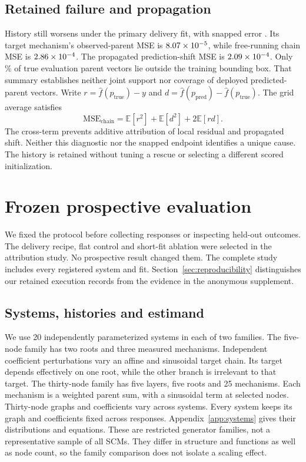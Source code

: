 \subsection{Retained failure and propagation}
History \WorseSeed{} still worsens under the primary delivery fit, with snapped
error \AWorseSnapped{}. Its target mechanism's observed-parent MSE is
$8.07\times10^{-5}{}$, while free-running chain MSE is $2.86\times10^{-4}{}$.
The propagated prediction-shift MSE is $2.09\times10^{-4}{}$. Only
\AWorseOutsidePercent{}\% of true evaluation parent vectors lie outside the
training bounding box. That summary establishes neither joint support nor
coverage of deployed predicted-parent vectors. Write
$r=\hat f(p_{\mathrm{true}})-y$ and
$d=\hat f(p_{\mathrm{pred}})-\hat f(p_{\mathrm{true}})$. The grid average satisfies
\[
 \mathrm{MSE}_{\mathrm{chain}}
 =\mathbb E[r^2]+\mathbb E[d^2]+2\mathbb E[rd].
\]
The cross-term prevents additive attribution of local residual and propagated
shift. Neither this diagnostic nor the snapped endpoint identifies a unique cause.
The history is retained without tuning a
rescue or selecting a different scored initialization.

\section{Frozen prospective evaluation}
\label{sec:prospective}
We fixed the protocol before collecting responses or inspecting held-out
outcomes. The delivery recipe, flat control and short-fit ablation were selected
in the attribution study. No prospective result changed them. The
complete study includes every registered system and fit. Section~\ref{sec:reproducibility}
distinguishes our retained execution records from the evidence in the anonymous
supplement.

\subsection{Systems, histories and estimand}
We use 20 independently parameterized systems in each of two families. The
five-node family has two roots and three measured mechanisms. Independent
coefficient perturbations vary an affine and sinusoidal target chain. Its target
depends effectively on one root, while the other branch is irrelevant to that
target. The thirty-node family has five layers, five roots and 25 mechanisms.
Each mechanism is a weighted parent sum, with a sinusoidal term at selected
nodes. Thirty-node graphs and coefficients vary across systems. Every system
keeps its graph and coefficients fixed across responses. Appendix~\ref{app:systems} gives their distributions and equations.
These are restricted generator families, not a representative sample of all
SCMs. They differ in structure and functions as well as node count, so the
family comparison does not isolate a scaling effect.

